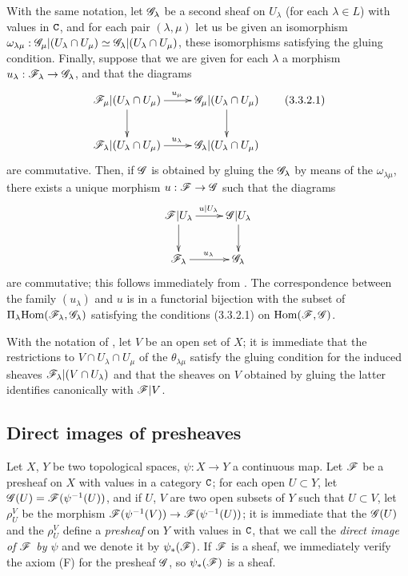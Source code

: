 \begin{env}[3.3.2]
\label{0.3.3.2}
With the same notation, let $\mathscr{G}_\lambda$ be a second sheaf on $U_\lambda$
(for each $\lambda\in L$) with values in $\mathtt{C}$, and for each pair $(\lambda,\mu)$
let us be given an isomorphism
$\omega_{\lambda\mu}:\mathscr{G}_\mu|(U_\lambda\cap U_\mu)
  \simeq\mathscr{G}_\lambda|(U_\lambda\cap U_\mu)$, these isomorphisms satisfying the
gluing condition. Finally, suppose that we are given for each $\lambda$ a
morphism $u_\lambda:\sh{F}_\lambda\to\sh{G}_\lambda$, and that the diagrams
\[
  \xymatrix{
    \sh{F}_\mu|(U_\lambda\cap U_\mu)\ar[r]^{u_\mu}\ar[d] &
    \sh{G}_\mu|(U_\lambda\cap U_\mu)\ar[d]\\
    \sh{F}_\lambda|(U_\lambda\cap U_\mu)\ar[r]^{u_\lambda} &
    \sh{G}_\lambda|(U_\lambda\cap U_\mu)
  }
  \tag{3.3.2.1}
\]
are commutative. Then, if $\mathscr{G}$ is obtained by gluing the $\mathscr{G}_\lambda$ by
means of the $\omega_{\lambda\mu}$, there exists a unique morphism
$u:\sh{F}\to\sh{G}$ such that the diagrams
\[
  \xymatrix{
    \sh{F}|U_\lambda\ar[r]^{u|U_\lambda}\ar[d] &
    \sh{G}|U_\lambda\ar[d]\\
    \sh{F}_\lambda\ar[r]^{u_\lambda} &
    \sh{G}_\lambda
  }
\]
are commutative; this follows immediately from .
The correspondence between the family $(u_\lambda)$ and $u$ is in a functorial
bijection with the subset of $\Pi_\lambda{\mathop{\mathrm{Hom}}\nolimits}(\mathscr{F}_\lambda,\mathscr{G}_\lambda)$
satisfying the conditions (3.3.2.1) on ${\mathop{\mathrm{Hom}}\nolimits}(\mathscr{F},\mathscr{G})$.
\end{env}

\begin{env}[3.3.3]
\label{0.3.3.3}
With the notation of , let $V$ be an open set of $X$; it is
immediate that the restrictions to $V\cap U_\lambda\cap U_\mu$ of the
$\theta_{\lambda\mu}$ satisfy the gluing condition for the induced sheaves
$\mathscr{F}_\lambda|(V\cap U_\lambda)$ and that the sheaves on $V$ obtained by
gluing the latter identifies canonically with $\mathscr{F}|V$.
\end{env}

\subsection{Direct images of presheaves}
\label{subsection:0.3.4}

\begin{env}[3.4.1]
\label{0.3.4.1}
Let $X$, $Y$ be two topological spaces, $\psi:X\to Y$ a continuous map. Let
$\mathscr{F}$ be a presheaf on $X$ with values in a category $\mathtt{C}$; for each open
$U\subset Y$, let $\mathscr{G}(U)=\mathscr{F}(\psi^{-1}(U))$, and if $U$, $V$ are two open
subsets of $Y$ such that $U\subset V$, let $\rho_U^V$ be the morphism
$\sh{F}(\psi^{-1}(V))\to\sh{F}(\psi^{-1}(U))$; it is immediate that the
$\mathscr{G}(U)$ and the $\rho_U^V$ define a \emph{presheaf} on $Y$ with values in
$\mathtt{C}$, that we call the \emph{direct image of $\mathscr{F}$ by $\psi$} and we denote
it by $\psi_*(\mathscr{F})$. If $\mathscr{F}$ is a sheaf, we immediately verify the axiom
(F) for the presheaf $\mathscr{G}$, so $\psi_*(\mathscr{F})$ is a sheaf.
\end{env}


